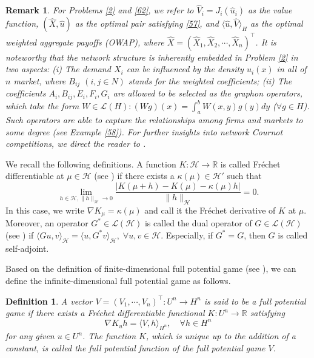 \documentclass[10pt]{article}
\newtheorem{remark}{Remark}[section]
\newtheorem{defn}{Definition}[section]
\begin{document}
\begin{remark}
For Problems \ref{2} and \ref{62}, we refer to  $\widehat{V}_i=J_i(\widehat{u}_i)$ as the value function, $(\widehat{X},\widehat{u})$ as the optimal pair satisfying \eqref{57}, and $\langle \widehat{u},\widehat{V}\rangle_H$ as the optimal weighted aggregate payoffs (OWAP), where $\widehat{X}=(\widehat{X}_1,\widehat{X}_2,\cdots,\widehat{X}_n)^{\top}$.  It is noteworthy that the network structure is inherently embedded in Problem \ref{2} in two aspects: (i) The demand $X_i$ can be influenced by the  density $u_i(x)$ in all of $n$ market, where $B_{ij}$ $(i,j\in N)$ stands for the weighted coefficients; (ii) The coefficients   $A_i,B_{ij},E_i,F_i,G_i$ are allowed to be selected as the graphon operators, which take the form $W\in\mathcal{L}(H):(Wg)(x)=\int_a^bW(x,y)g(y)dy$ ($\forall  g\in H$). Such operators are able to capture the relationships among   firms and markets to some degree (see Example \ref{58}).   For further insights into network Cournot competitions, we direct the reader to \citep{bimpikis2019cournot, cai2019role, MR4755704, MR4237615}.
\end{remark}


We recall the following definitions.  A function $K:\mathcal{H}\rightarrow \mathbb{R}$ is called Fr\'{e}chet  differentiable at $\mu\in \mathcal{H}$ (see \citep{MR4363403}) if there exists a $\kappa(\mu)\in \mathcal{H}'$ such that
$$
\lim_{h\in\mathcal{H},\|h\|_{\mathcal{H}}\rightarrow 0}\frac{|K(\mu+h)-K(\mu)-\kappa(\mu)h|}{\|h\|_{\mathcal{H}}}=0.
$$
In this case, we write $\nabla K_{\mu}=\kappa(\mu)$ and call it the Fr\'{e}chet derivative of $K$ at $\mu$.  Moreover, an operator $G^*\in\mathcal{L}(\mathcal{H})$ is called the dual operator of $G\in\mathcal{L}(\mathcal{H})$  (see \citep{MR4738264}) if
$\langle Gu,v\rangle_{\mathcal{H}}=\langle u,G^*v\rangle_{\mathcal{H}}, \;\forall u,v\in \mathcal{H}.$
Especially, if $G^*=G$, then $G$ is called self-adjoint.


Based on the definition of finite-dimensional full potential game (see \citep[Subsection 3.1.2]{MR2560519}), we can define the infinite-dimensional full potential game as follows.
\begin{defn}\label{51}
A vector $V=(V_1,\cdots,V_n)^{\top}:U^n\rightarrow H^n$ is said to be a full potential game if there exists a Fr\'{e}chet  differentiable functional $K:U^n\rightarrow \mathbb{R}$ satisfying
\begin{equation}\label{44}
\nabla K_uh=\langle V,h \rangle_{H^n}, \quad \forall h\in H^n
\end{equation}
 for any given $u\in U^n$. The function $K$, which is unique up to the addition of a constant, is called the full potential function of the full potential game $V$.
\end{defn}
\end{document}
